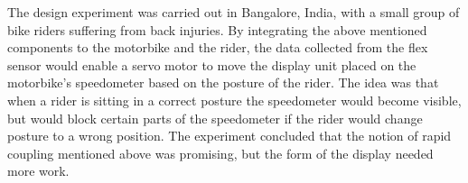 The design experiment was carried out in Bangalore, India, with a small group of bike riders suffering from back injuries. By integrating the above mentioned components to the motorbike and the rider, the data collected from the flex sensor would enable a servo motor to move the display unit placed on the motorbike's speedometer based on the posture of the rider. The idea was that when a rider is sitting in a correct posture the speedometer would become visible, but would block certain parts of the speedometer if the rider would change posture to a wrong position. The experiment concluded that the notion of rapid coupling mentioned above was promising, but the form of the display needed more work. 

